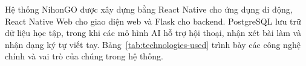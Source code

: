 Hệ thống NihonGO được xây dựng bằng React Native cho ứng dụng di động, React Native Web cho giao diện web và Flask cho backend. PostgreSQL lưu trữ dữ liệu học tập, trong khi các mô hình AI hỗ trợ hội thoại, nhận xét bài làm và nhận dạng ký tự viết tay. Bảng~\ref{tab:technologies-used} trình bày các công nghệ chính và vai trò của chúng trong hệ thống.

\begingroup
{}
\fontsize{11}{14}\selectfont
\renewcommand{\arraystretch}{1}
\setlength{\LTleft}{0pt}
\setlength{\LTright}{\fill}
